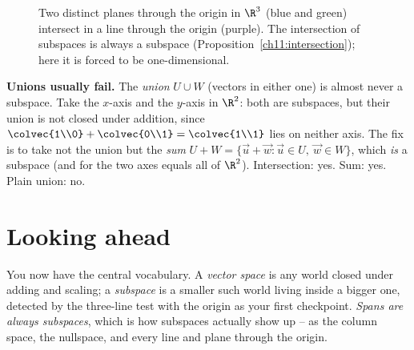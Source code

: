 \begin{figure}[H]
\centering
{}
\caption{Two distinct planes through the origin in $\R^3$ (blue and green) intersect in a
line through the origin (purple). The intersection of subspaces is always a subspace
(Proposition~\ref{ch11:intersection}); here it is forced to be one-dimensional.}
\label{ch11:fig-intersection}
\end{figure}

\begin{trapbox}
\textbf{Unions usually fail.} The \emph{union} $U\cup W$ (vectors in either one) is almost
never a subspace. Take the $x$-axis and the $y$-axis in $\R^2$: both are subspaces, but
their union is not closed under addition, since
$\colvec{1\\0}+\colvec{0\\1}=\colvec{1\\1}$ lies on neither axis. The fix is to take not
the union but the \emph{sum} $U + W = \{\vec{u}+\vec{w} : \vec{u}\in U,\ \vec{w}\in W\}$,
which \emph{is} a subspace (and for the two axes equals all of $\R^2$). Intersection: yes.
Sum: yes. Plain union: no.
\end{trapbox}

\section{Looking ahead}

You now have the central vocabulary. A \emph{vector space} is any world closed under
adding and scaling; a \emph{subspace} is a smaller such world living inside a bigger one,
detected by the three-line test with the origin as your first checkpoint. \emph{Spans are
always subspaces}, which is how subspaces actually show up -- as the column space, the
nullspace, and every line and plane through the origin.

